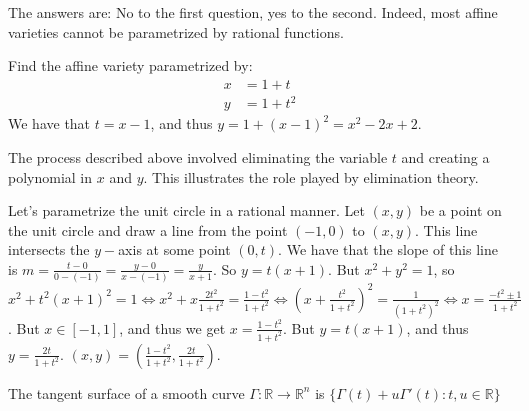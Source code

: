 \documentclass[crop=false,class=book,oneside]{standalone}
\begin{document}
                The answers are: No to the first question,
                yes to the second. Indeed, most affine varieties
                cannot be parametrized by rational functions.
                \begin{example}
                    Find the affine variety parametrized by:
                    \begin{align*}
                        x&=1+t\\
                        y&=1+t^{2}
                    \end{align*}
                    We have that $t=x-1$, and thus
                    $y=1+(x-1)^{2}=x^{2}-2x+2$.
                \end{example}
                \begin{remark}
                    The process described above involved
                    eliminating the variable $t$ and creating
                    a polynomial in $x$ and $y$. This illustrates
                    the role played by elimination theory.
                \end{remark}
                \begin{example}
                    Let's parametrize the unit circle in a
                    rational manner. Let $(x,y)$ be a point on
                    the unit circle and draw a line from the
                    point $(-1,0)$ to $(x,y)$. This line intersects
                    the $y-$axis at some point $(0,t)$. We have
                    that the slope of this line is
                    $m=\frac{t-0}{0-(-1)}%
                     =\frac{y-0}{x-(-1)}=\frac{y}{x+1}$.
                    So $y=t(x+1)$. But $x^{2}+y^{2}=1$,
                    so
                    $x^2+t^{2}(x+1)^{2}%
                     =1\Leftrightarrow x^{2}+x\frac{2t^{2}}{1+t^{2}}%
                     =\frac{1-t^2}{1+t^2}%
                     \Leftrightarrow(x+\frac{t^{2}}{1+t^{2}})^{2}%
                     =\frac{1}{(1+t^{2})^{2}}%
                     \Leftrightarrow x=\frac{-t^{2}\pm 1}{1+t^{2}}$.
                    But $x\in [-1,1]$, and thus we get
                    $x=\frac{1-t^2}{1+t^2}$.
                    But $y=t(x+1)$, and thus
                    $y=\frac{2t}{1+t^2}$.
                    $(x,y)=(\frac{1-t^{2}}{1+t^{2}},\frac{2t}{1+t^{2}})$.
                \end{example}
                \begin{definition}
                    The tangent surface of a smooth curve
                    $\Gamma:\mathbb{R}\rightarrow\mathbb{R}^n$
                    is $\{\Gamma(t)+u\Gamma'(t):t,u\in \mathbb{R}\}$
                \end{definition}
\end{document}

